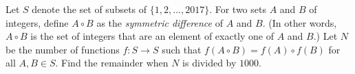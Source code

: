 Let $S$ denote the set of subsets of $\{1,2,\ldots,2017\}$. For two sets $A$ and $B$ of integers, define $A\circ B$ as the \emph{symmetric difference} of $A$ and $B$. (In other words, $A\circ B$ is the set of integers that are an element of exactly one of $A$ and $B$.) Let $N$ be the number of functions $f:S\rightarrow S$ such that $f(A\circ B)=f(A)\circ f(B)$ for all $A,B\in S$. Find the remainder when $N$ is divided by $1000$.
